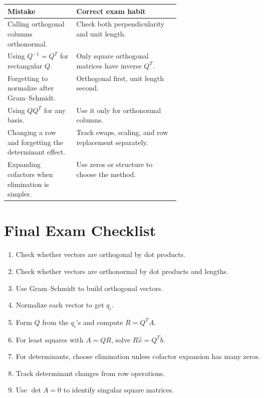 \documentclass[10pt]{article}
\begin{document}
\begin{center}
\small
\begin{tabularx}{\linewidth}{@{}L{0.40\linewidth}Y@{}}
\toprule
Mistake & Correct exam habit \\
\midrule
Calling orthogonal columns orthonormal. & Check both perpendicularity and unit length. \\
Using \(Q^{-1}=Q^{T}\) for rectangular \(Q\). & Only square orthogonal matrices have inverse \(Q^{T}\). \\
Forgetting to normalize after Gram--Schmidt. & Orthogonal first, unit length second. \\
Using \(QQ^{T}\) for any basis. & Use it only for orthonormal columns. \\
Changing a row and forgetting the determinant effect. & Track swaps, scaling, and row replacement separately. \\
Expanding cofactors when elimination is simpler. & Use zeros or structure to choose the method. \\
\bottomrule
\end{tabularx}
\end{center}

\section{Final Exam Checklist}

\begin{enumerate}
  \item Check whether vectors are orthogonal by dot products.
  \item Check whether vectors are orthonormal by dot products and lengths.
  \item Use Gram--Schmidt to build orthogonal vectors.
  \item Normalize each vector to get \(q_i\).
  \item Form \(Q\) from the \(q_i\)'s and compute \(R=Q^{T}A\).
  \item For least squares with \(A=QR\), solve \(R\hat{x}=Q^{T}b\).
  \item For determinants, choose elimination unless cofactor expansion has many zeros.
  \item Track determinant changes from row operations.
  \item Use \(\det A=0\) to identify singular square matrices.
\end{enumerate}
\end{document}
